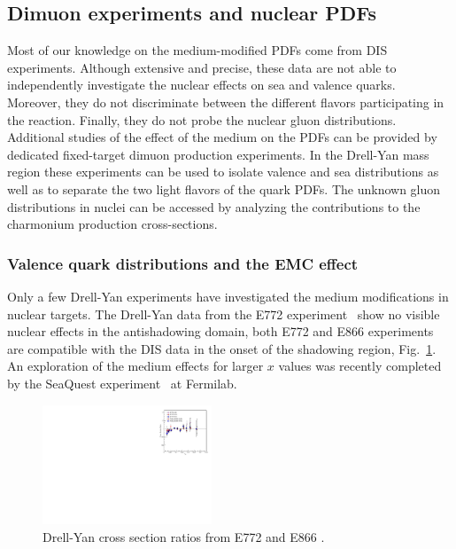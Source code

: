 \subsection{Dimuon experiments and nuclear PDFs}

Most of our knowledge on the medium-modified PDFs come from DIS experiments. Although extensive and precise, 
these data are not able to independently investigate the nuclear effects on sea and valence quarks.  
Moreover, they do not discriminate between the different flavors participating in the reaction. Finally, 
they do not probe the nuclear gluon distributions. Additional studies of the effect of the medium on the 
PDFs can be provided by dedicated fixed-target dimuon production experiments. In the Drell-Yan mass region
 these experiments can be used to isolate  
valence and sea distributions as well as to separate the two light flavors of the quark PDFs. 
The unknown gluon distributions in nuclei can be accessed by analyzing the contributions to  
the charmonium production cross-sections. 
 
\subsubsection {Valence quark distributions and the EMC effect}
Only a few Drell-Yan experiments have investigated the medium modifications in nuclear targets. 
The Drell-Yan data from the E772 experiment~\cite{Alde:1990im} show no visible nuclear effects in 
the antishadowing domain, both E772 and E866 experiments~\cite{Vasilev:1999fa} are compatible 
with the DIS data in the onset of the shadowing region, Fig.~\ref{fig:drell-yan}.  An exploration of the medium effects for larger $x$ 
values was recently completed by the SeaQuest experiment~\cite{Arrington:2006} at Fermilab. 

\begin{center}
\begin{figure}[htb]
  \includegraphics[width=0.45\textwidth]{plots/Drell-Yan_EMC.pdf}
  \caption{Drell-Yan cross section ratios from E772 and E866 \cite{Alde:1990im, Vasilev:1999fa}.}
  \label{fig:drell-yan}
\end{figure}
\end{center}


